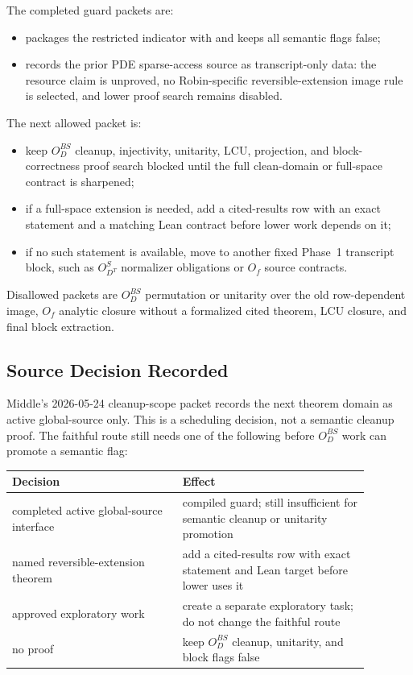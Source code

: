 The completed guard packets are:
\begin{itemize}
\item
{}
packages the restricted indicator with
 and keeps
all semantic flags false;
\item
{}
records the prior PDE sparse-access source as transcript-only data: the
resource claim is unproved, no Robin-specific reversible-extension image rule
is selected, and lower proof search remains disabled.
\end{itemize}

The next allowed packet is:
\begin{itemize}
\item keep \(O_D^{BS}\) cleanup, injectivity, unitarity, LCU, projection, and
block-correctness proof search blocked until the full clean-domain or
full-space contract is sharpened;
\item if a full-space extension is needed, add a cited-results row with an
exact statement and a matching Lean contract before lower work depends on it;
\item if no such statement is available, move to another fixed Phase~1
transcript block, such as \(O_{D^T}^{S}\) normalizer obligations or \(O_f\)
source contracts.
\end{itemize}

Disallowed packets are \(O_D^{BS}\) permutation or unitarity over the old
row-dependent image, \(O_f\) analytic closure without a formalized cited
theorem, LCU closure, and final block extraction.

\subsection{Source Decision Recorded}

Middle's 2026-05-24 cleanup-scope packet records the next theorem domain as
active global-source only.  This is a scheduling decision, not a semantic
cleanup proof.  The faithful route still needs one of the following before
\(O_D^{BS}\) work can promote a semantic flag:

\begin{center}
\begin{tabular}{p{0.42\linewidth}p{0.46\linewidth}}
\hline
Decision & Effect \\
\hline
completed active global-source interface &
compiled guard; still insufficient for semantic cleanup or unitarity promotion \\
named reversible-extension theorem &
add a cited-results row with exact statement and Lean target before lower uses it \\
approved exploratory work &
create a separate exploratory task; do not change the faithful route \\
no proof &
keep \(O_D^{BS}\) cleanup, unitarity, and block flags false \\
\hline
\end{tabular}
\end{center}

